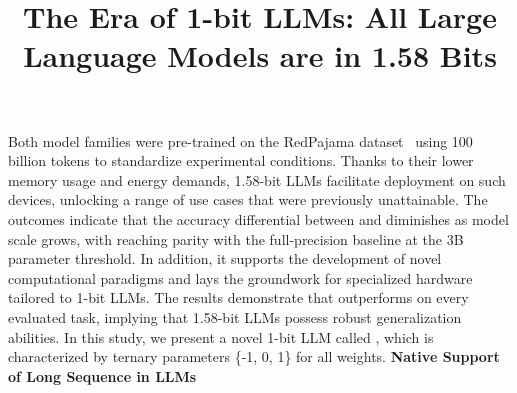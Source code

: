 \title{The Era of 1-bit LLMs: All Large Language Models are in 1.58 Bits}
Both model families were pre-trained on the RedPajama dataset~\cite{redpajama} using 100 billion tokens to standardize experimental conditions. Thanks to their lower memory usage and energy demands, 1.58-bit LLMs facilitate deployment on such devices, unlocking a range of use cases that were previously unattainable. The outcomes indicate that the accuracy differential between  and  diminishes as model scale grows, with  reaching parity with the full-precision baseline at the 3B parameter threshold. In addition, it supports the development of novel computational paradigms and lays the groundwork for specialized hardware tailored to 1-bit LLMs. The results demonstrate that  outperforms on every evaluated task, implying that 1.58-bit LLMs possess robust generalization abilities. In this study, we present a novel 1-bit LLM called \textbf{}, which is characterized by ternary parameters \{-1, 0, 1\} for all weights. \textbf{Native Support of Long Sequence in LLMs}

